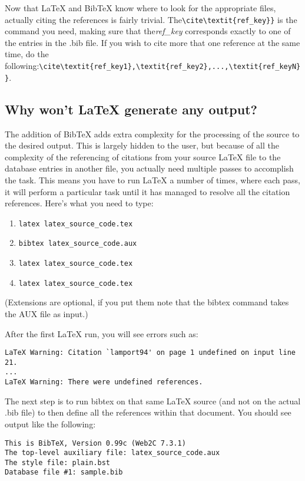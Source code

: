 Now that LaTeX and BibTeX know where to look for the appropriate files,
actually citing the references is fairly trivial.
The\verb|\cite\textit{ref_key}}| is the command you need, making sure that
the\textit{ref\_key} corresponds exactly to one of the entries in the .bib file.
If you wish to cite more that one reference at the same time, do the
following:\verb|\cite\textit{ref_key1},\textit{ref_key2},...,\textit{ref_keyN}}|.

\subsection{Why won't LaTeX generate any output?}
The addition of BibTeX adds extra complexity for the processing of the source
to the desired output. This is largely hidden to the user, but because of all
the complexity of the referencing of citations from your source LaTeX file to
the database entries in another file, you actually need multiple passes to
accomplish the task. This means you have to run LaTeX a number of times, where
each pass, it will perform a particular task until it has managed to resolve
all the citation references. Here's what you need to type:
\begin{enumerate}
\item \verb|latex latex_source_code.tex|
\item \verb|bibtex latex_source_code.aux|
\item \verb|latex latex_source_code.tex|
\item \verb|latex latex_source_code.tex|
\end{enumerate}
(Extensions are optional, if you put them note that the bibtex command takes the AUX file as input.)

After the first LaTeX run, you will see errors such as:


\begin{verbatim}
LaTeX Warning: Citation `lamport94' on page 1 undefined on input line 21.
...
LaTeX Warning: There were undefined references.

\end{verbatim}

The next step is to run bibtex on that same LaTeX source (and not on the actual .bib file) to then define all the references within that document. You should see output like the following:


\begin{verbatim}
This is BibTeX, Version 0.99c (Web2C 7.3.1)
The top-level auxiliary file: latex_source_code.aux
The style file: plain.bst
Database file #1: sample.bib

\end{verbatim}

